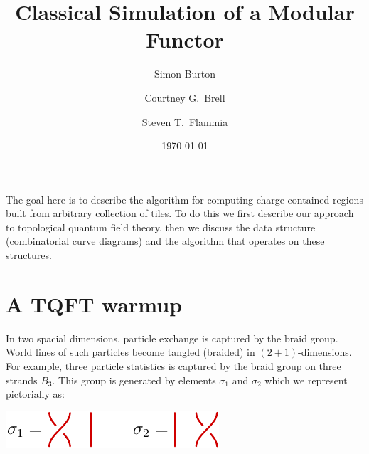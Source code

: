 \documentclass[aps, prl, letterpaper, twocolumn, superscriptaddress, notitlepage, 10pt]{revtex4-1}
\begin{document}
\title{Classical Simulation of a Modular Functor}

\author{Simon Burton}
\author{Courtney G.\ Brell}
\author{Steven T.\ Flammia}

\date{\today}

\maketitle


\onecolumngrid
\appendix



The goal here is to describe the algorithm for
computing charge contained regions built from 
arbitrary collection of tiles.
To do this we first describe our approach
to topological quantum field theory,
then we discuss the data structure 
(combinatorial curve diagrams) and the algorithm
that operates on these structures.


%
%

\section{A TQFT warmup}

In two spacial dimensions, particle exchange is
captured by the braid group.
World lines of such particles 
become tangled (braided) in $(2+1)$-dimensions.
For example, three particle statistics is captured
by the braid group on three strands $B_3.$
This group is generated by elements $\sigma_1$
and $\sigma_2$ which we represent pictorially as:
\begin{center}
\includegraphics[]{pic-braid-group.pdf}
\end{center}
\end{document}
